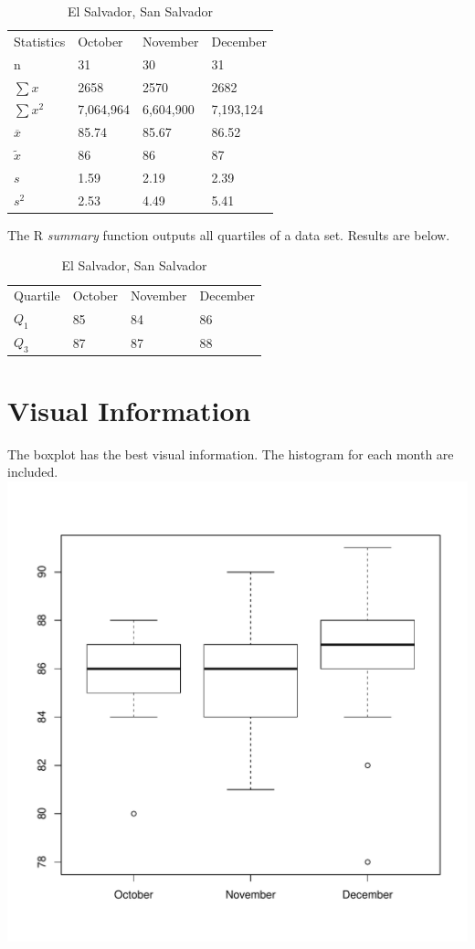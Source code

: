 \documentclass[12pt]{amsart} \usepackage{amscd} \usepackage{epsfig}
\begin{document}
\begin{table}[H]
\centering
\caption{El Salvador, San Salvador}
\begin{tabular}{llll}
\hline \hline 
Statistics & October & November & December \\
n & 31 & 30 & 31 \\
$\sum{x}$ & 2658  & 2570 & 2682 \\
$\sum{x^2}$ & 7,064,964 & 6,604,900 & 7,193,124 \\
$\overline{x}$ & 85.74 & 85.67 & 86.52 \\
$\tilde{x}$ & 86 & 86 & 87 \\
$s$ & 1.59 & 2.19 & 2.39  \\
$s^2$ & 2.53  & 4.49 & 5.41 
\end{tabular}
\end{table}

The R \textit{summary} function outputs all quartiles of a data set.  Results
are below.
\begin{table}[H]
\centering
\caption{El Salvador, San Salvador}
\begin{tabular}{llll}
\hline \hline 
Quartile & October & November & December \\
$Q_{1}$ & 85 & 84 & 86 \\
$Q_{3}$ & 87 & 87 & 88
\end{tabular}
\end{table}

\section*{Visual Information}
The boxplot has the best visual information.  The histogram for each
month are included.
\includegraphics[scale=0.75]{boxplot.pdf}
\end{document}
